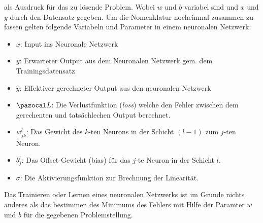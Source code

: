 als Ausdruck für das zu lösende Problem. Wobei $w$ und $b$ variabel sind und $x$ und $y$ durch den Datensatz gegeben.
Um die Nomenklatur nocheinmal zusammen zu fassen gelten folgende Variabeln und Parameter in einem neuronalen Netzwerk: 
\begin{itemize}
	\item{$x$: Input ins Neuronale Netzwerk}
	\item{$y$: Erwarteter Output aus dem Neuronalen Netzwerk gem. dem Trainingsdatensatz}
	\item{$\hat{y}$: Effektiver gerechneter Output aus den neuronalen Netzwerk}
	\item{$\Lb$: Die Verlustfunktion (\textit{loss}) welche den Fehler zwischen dem gerechenten und tatsächlechen Output berechnet.}
	\item{$w_{jk}^{l}$: Das Gewicht des $k$-ten Neurons in der Schicht $(l-1)$ zum $j$-ten Neuron.}
	\item{$b_{j}^{l}$: Das Offset-Gewicht (bias) für das $j$-te Neuron in der Schicht $l$.}
	\item{$\sigma$: Die Aktivierungsfunktion zur Brechnung der Linearität.}
\end{itemize}
Das Trainieren oder Lernen eines neuronalen Netzwerks ist im Grunde nichts anderes als das bestimmen des Minimums des Fehlers mit Hilfe der Paramter $w$ und $b$ für die gegebenen Problemstellung. 